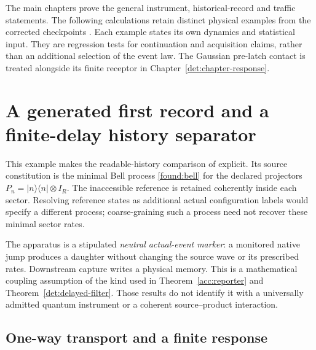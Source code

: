 \documentclass[11pt,oneside,openany]{book}
\theoremstyle{definition}
\theoremstyle{remark}\newtheorem{remark}[theorem]{Remark}
\begin{document}
The main chapters prove the general instrument, historical-record and
traffic statements. The following calculations retain distinct physical
examples from the corrected checkpoints \cite{C01,C02,C03}. Each example
states its own dynamics and statistical input. They are regression tests
for continuation and acquisition claims, rather than an additional
selection of the event law. The Gaussian pre-latch contact is treated
alongside its finite receptor in Chapter~\ref{det:chapter-response}.


\section{A generated first record and a finite-delay history separator}
\label{bench:history}

This example makes the readable-history comparison of \cite{C01}
explicit. Its source constitution is the minimal Bell process
\eqref{found:bell} for the declared projectors
$P_n=|n\rangle\langle n|\otimes I_R$. The inaccessible reference is
retained coherently inside each sector. Resolving reference states as
additional actual configuration labels would specify a different
process; coarse-graining such a process need not recover these minimal
sector rates.

The apparatus is a stipulated \emph{neutral actual-event marker}:
a monitored native jump produces a daughter without changing the source
wave or its prescribed rates. Downstream capture writes a physical
memory. This is a mathematical coupling assumption of the kind used in
Theorem~\ref{acc:reporter} and Theorem~\ref{det:delayed-filter}.
Those results do not identify it with a universally admitted quantum
instrument or a coherent source--product interaction.

\subsection{One-way transport and a finite response}
\end{document}
